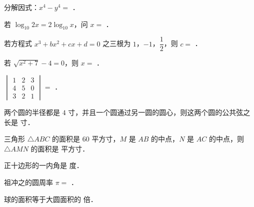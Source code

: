 

\par\medskip


\begin{question}
分解因式：$x^4-y^4=$ \gkblank{}．

\end{question}
\begin{question}
若 $\log_{10}2x=2\log_{10}x$，问 $x=$ \gkblank{}．

\end{question}
\begin{question}
若方程式 $x^3+bx^2+cx+d=0$ 之三根为 $1$，$-1$，$\dfrac12$，则 $c=$ \gkblank{}．

\end{question}
\begin{question}
若 $\sqrt{x^2+7}-4=0$，则 $x=$ \gkblank{}．

\end{question}
\begin{question}
$\begin{vmatrix}1&2&3\\4&5&0\\3&2&1\end{vmatrix}=$ \gkblank{}．

\end{question}
\begin{question}
两个圆的半径都是 $4$ 寸，并且一个圆通过另一圆的圆心，则这两个圆的公共弦之长是 \gkblank{} 寸．

\end{question}
\begin{question}
三角形 $\triangle ABC$ 的面积是 $60$ \mbox{平方寸}，$M$ 是 $AB$ 的中点，$N$ 是 $AC$ 的中点，则 $\triangle AMN$ 的面积是 \gkblank{} \mbox{平方寸}．

\end{question}
\begin{question}
正十边形的一内角是 \gkblank{} 度．

\end{question}
\begin{question}
祖冲之的圆周率 $\pi=$ \gkblank{}．

\end{question}
\begin{question}
球的面积等于大圆面积的 \gkblank{} 倍．

\end{question}
